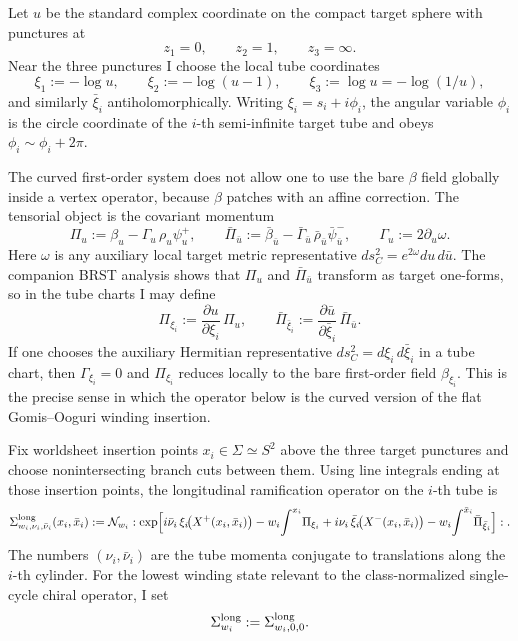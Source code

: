 \documentclass[11pt]{article}
\newcommand{\mc}[1]{\mathcal{#1}}
\begin{document}
Let $u$ be the standard complex coordinate on the compact target sphere with punctures at
\[
z_1=0,\qquad z_2=1,\qquad z_3=\infty.
\]
Near the three punctures I choose the local tube coordinates
\begin{equation}\label{eq:target-tube-coordinate}
\xi_1:=-\log u,
\qquad
\xi_2:=-\log(u-1),
\qquad
\xi_3:=\log u=-\log(1/u),
\end{equation}
and similarly $\bar\xi_i$ antiholomorphically. Writing $\xi_i=s_i+i\phi_i$, the angular variable $\phi_i$ is the circle coordinate of the $i$-th semi-infinite target tube and obeys $\phi_i\sim \phi_i+2\pi$.

The curved first-order system does not allow one to use the bare $\beta$ field globally inside a vertex operator, because $\beta$ patches with an affine correction. The tensorial object is the covariant momentum
\begin{equation}\label{eq:tube-covariant-momentum}
\Pi_u:=\beta_u-\Gamma_u\,\rho_u\psi_u^+,
\qquad
\bar\Pi_{\bar u}:=\bar\beta_{\bar u}-\bar\Gamma_{\bar u}\,\bar\rho_{\bar u}\bar\psi_{\bar u}^-,
\qquad
\Gamma_u:=2\partial_u\omega.
\end{equation}
Here $\omega$ is any auxiliary local target metric representative $ds_C^2=e^{2\omega}du\,d\bar u$. The companion BRST analysis shows that $\Pi_u$ and $\bar\Pi_{\bar u}$ transform as target one-forms, so in the tube charts I may define
\begin{equation}\label{eq:tube-covariant-components}
\Pi_{\xi_i}:=\frac{\partial u}{\partial \xi_i}\,\Pi_u,
\qquad
\bar\Pi_{\bar\xi_i}:=\frac{\partial \bar u}{\partial \bar\xi_i}\,\bar\Pi_{\bar u}.
\end{equation}
If one chooses the auxiliary Hermitian representative $ds_C^2=d\xi_i\,d\bar\xi_i$ in a tube chart, then $\Gamma_{\xi_i}=0$ and $\Pi_{\xi_i}$ reduces locally to the bare first-order field $\beta_{\xi_i}$. This is the precise sense in which the operator below is the curved version of the flat Gomis--Ooguri winding insertion.

Fix worldsheet insertion points $x_i\in \Sigma\simeq S^2$ above the three target punctures and choose nonintersecting branch cuts between them. Using line integrals ending at those insertion points, the longitudinal ramification operator on the $i$-th tube is
\begin{equation}\label{eq:fixed-cover-vertex-factorization}
\Sigma^{\rm long}_{w_i,\nu_i,\bar\nu_i}(x_i,\bar x_i)
:=
\mc N_{w_i}
:\exp\!\Big[
i\bar\nu_i\,\xi_i\!\big(X^+(x_i,\bar x_i)\big)
-w_i\!\int^{x_i}\!\Pi_{\xi_i}
+i\nu_i\,\bar\xi_i\!\big(X^-(x_i,\bar x_i)\big)
-w_i\!\int^{\bar x_i}\!\bar\Pi_{\bar\xi_i}
\Big]:.
\end{equation}
The numbers $(\nu_i,\bar\nu_i)$ are the tube momenta conjugate to translations along the $i$-th cylinder. For the lowest winding state relevant to the class-normalized single-cycle chiral operator, I set
\begin{equation}\label{eq:lowest-longitudinal-state}
\Sigma^{\rm long}_{w_i}
:=
\Sigma^{\rm long}_{w_i,0,0}.
\end{equation}
\end{document}
